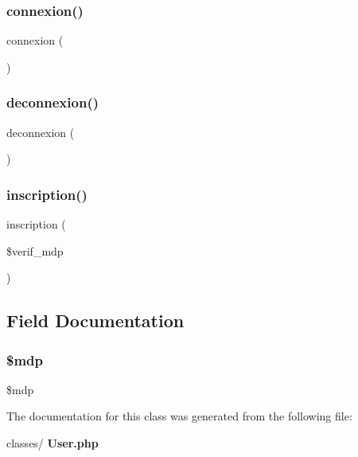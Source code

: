 \subsubsection{connexion()}
{\footnotesize\ttfamily connexion (\begin{DoxyParamCaption}{ }\end{DoxyParamCaption})}

\mbox{\label{class_user_a999ec8c14031968ce9d6ba2410105d4b}} 
\subsubsection{deconnexion()}
{\footnotesize\ttfamily deconnexion (\begin{DoxyParamCaption}{ }\end{DoxyParamCaption})}

\mbox{\label{class_user_af10edcf6810fc3a4232bc4a309530db2}} 
\subsubsection{inscription()}
{\footnotesize\ttfamily inscription (\begin{DoxyParamCaption}\item[{}]{\$verif\+\_\+mdp }\end{DoxyParamCaption})}



\subsection{Field Documentation}
\mbox{\label{class_user_a8a65334de2f0d486a42b02ecf82fe8fb}} 
\subsubsection{\$mdp}
{\footnotesize\ttfamily \$mdp}



The documentation for this class was generated from the following file\+:\begin{DoxyCompactItemize}
\item 
classes/\textbf{ User.\+php}\end{DoxyCompactItemize}

